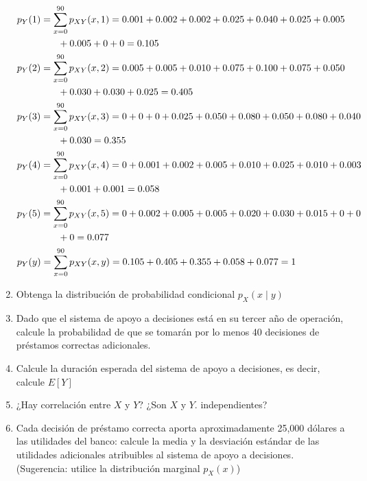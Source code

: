 \documentclass[12pt]{report}
\begin{document}
\begin{enumerate}
    \begin{align*}
      &p_Y(1) = \sum_{x=0}^{90} p_{XY}(x, 1) = 0.001 + 0.002 + 0.002 + 0.025 + 0.040 + 0.025 + 0.005 \\
      &\hspace*{1.5cm} + 0.005 + 0 + 0 = 0.105 \\
      &p_Y(2) = \sum_{x=0}^{90} p_{XY}(x, 2) = 0.005 + 0.005 + 0.010 + 0.075 + 0.100 + 0.075 + 0.050 \\
      &\hspace*{1.5cm} + 0.030 + 0.030 + 0.025 = 0.405 \\
      &p_Y(3) = \sum_{x=0}^{90} p_{XY}(x, 3) = 0 + 0 + 0 + 0.025 + 0.050 + 0.080 + 0.050 + 0.080 + 0.040 \\
      &\hspace*{1.5cm} + 0.030 = 0.355 \\
      &p_Y(4) = \sum_{x=0}^{90} p_{XY}(x, 4) = 0 + 0.001 + 0.002 + 0.005 + 0.010 + 0.025 + 0.010 + 0.003 \\
      &\hspace*{1.5cm} + 0.001 + 0.001 = 0.058 \\
      &p_Y(5) = \sum_{x=0}^{90} p_{XY}(x, 5) = 0 + 0.002 + 0.005 + 0.005 + 0.020 + 0.030 + 0.015 + 0 + 0 \\
      &\hspace*{1.5cm} + 0 = 0.077 \\
      &p_Y(y) = \sum_{x=0}^{90} p_{XY}(x, y) = 0.105 + 0.405 + 0.355 + 0.058 + 0.077 = 1
    \end{align*}

    \item Obtenga la distribución de probabilidad condicional $p_X(x \mid y)$
    
    \item Dado que el sistema de apoyo a decisiones está en su tercer año de operación, calcule la probabilidad de que se tomarán por lo menos 40 decisiones de préstamos correctas adicionales.
    
    \item Calcule la duración esperada del sistema de apoyo a decisiones, es decir, calcule $E[Y]$
    
    \item ¿Hay correlación entre $X$ y $Y$? ¿Son $X$ y $Y$. independientes?
    
    \item Cada decisión de préstamo correcta aporta aproximadamente 25,000 dólares a las utilidades del banco: calcule la media y la desviación estándar de las utilidades adicionales atribuibles al sistema de apoyo a decisiones. (Sugerencia: utilice la distribución marginal $p_X(x)$)
    
  \end{enumerate}
  
\end{document}
